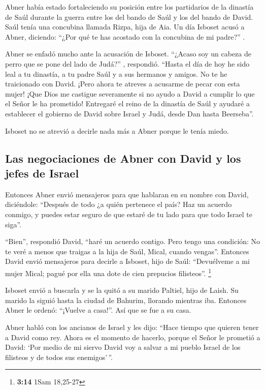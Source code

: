  Abner había estado fortaleciendo su posición entre los
partidarios de la dinastía de Saúl durante la guerra entre los del bando
de Saúl y los del bando de David.  Saúl tenía una
concubina llamada Rizpa, hija de Aia. Un día Isboset acusó a Abner,
diciendo: ``¿Por qué te has acostado con la concubina de mi padre?'' .

 Abner se enfadó mucho ante la acusación de Isboset.
``¿Acaso soy un cabeza de perro que se pone del lado de Judá?'' ,
respondió. ``Hasta el día de hoy he sido leal a tu dinastía, a tu padre
Saúl y a sus hermanos y amigos. No te he traicionado con David. ¡Pero
ahora te atreves a acusarme de pecar con esta mujer!  ¡Que
Dios me castigue severamente si no ayudo a David a cumplir lo que el
Señor le ha prometido!  Entregaré el reino de la dinastía
de Saúl y ayudaré a establecer el gobierno de David sobre Israel y Judá,
desde Dan hasta Beerseba''.

 Isboset no se atrevió a decirle nada más a Abner porque
le tenía miedo.

\hypertarget{las-negociaciones-de-abner-con-david-y-los-jefes-de-israel}{%
\subsection{Las negociaciones de Abner con David y los jefes de
Israel}\label{las-negociaciones-de-abner-con-david-y-los-jefes-de-israel}}

 Entonces Abner envió mensajeros para que hablaran en su
nombre con David, diciéndole: ``Después de todo ¿a quién pertenece el
país? Haz un acuerdo conmigo, y puedes estar seguro de que estaré de tu
lado para que todo Israel te siga''.

 ``Bien'', respondió David, ``haré un acuerdo contigo.
Pero tengo una condición: No te veré a menos que traigas a la hija de
Saúl, Mical, cuando vengas''.  Entonces David envió
mensajeros para decirle a Isboset, hijo de Saúl: ``Devuélveme a mi mujer
Mical; pagué por ella una dote de cien prepucios filisteos''.
\footnote{\textbf{3:14} 1Sam 18,25-27}

 Isboset envió a buscarla y se la quitó a su marido
Paltiel, hijo de Laish.  Su marido la siguió hasta la
ciudad de Bahurim, llorando mientras iba. Entonces Abner le ordenó:
``¡Vuelve a casa!''. Así que se fue a su casa.

 Abner habló con los ancianos de Israel y les dijo:
``Hace tiempo que quieren tener a David como rey.  Ahora
es el momento de hacerlo, porque el Señor le prometió a David: `Por
medio de mi siervo David voy a salvar a mi pueblo Israel de los
filisteos y de todos sus enemigos'\,''.

